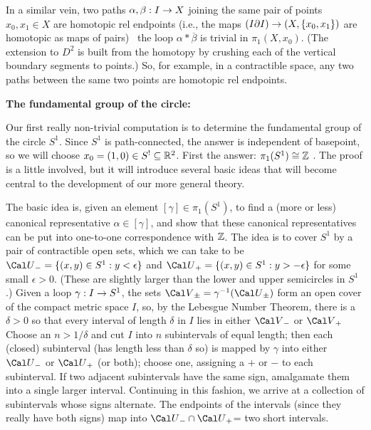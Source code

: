 In a similar vein, two paths $\alpha,\beta:I\rightarrow X$ joining the same pair of points
$x_0,x_1\in X$ are homotopic rel endpoints (i.e., the maps $(I\partial I)\rightarrow(X,\{x_0,x_1\})$
are homotopic as maps of pairs) \lra\ the loop $\alpha *\overline{\beta}$ is 
trivial in $\pi_1(X,x_0)$. (The extension to $D^2$ is built from the
homotopy by crushing each of the vertical boundary segments to points.) So, for
example, in a contractible space, any two paths between the same two points are
homotopic rel endpoints.

\msk

{\bf The fundamental group of the circle:}

\ssk

Our first really non-trivial computation is to determine the fundamental group of the
circle $S^1$. Since $S^1$ is path-connected, the answer is independent of basepoint,
so we will choose $x_0=(1,0)\in S^!\subseteq{\Bbb R}^2$. First the answer: $\pi_1(S^1)\cong{\Bbb Z}$ .
The proof is a little involved, but it will introduce several basic ideas that will
become central to the development of our more general theory.

The basic idea is, given an element $[\gamma]\in\pi_1(S^1)$, to find a (more or
less) canonical representative $\alpha\in[\gamma]$, and show that these canonical
representatives can be put into one-to-one correspondence with ${\Bbb Z}$. The idea
is to cover $S^1$ by a pair of contractible open sets, which we can take to be
${\Cal U}_- = \{(x,y)\in S^1 : y < \epsilon\}$ and ${\Cal U}_+ = \{(x,y)\in S^1 : y > -\epsilon\}$
for some small $\epsilon > 0$. (These are slightly larger than the lower and upper
semicircles in $S^1$.) Given a loop $\gamma:I\rightarrow S^1$, the sets 
${\Cal V}_\pm=\gamma^{-1}({\Cal U}_\pm)$
form an open cover of the compact metric space $I$, so, by the Lebesgue Number Theorem,
there is a $\delta>0$ so that every interval of length $\delta$ in $I$ lies in either
${\Cal V}_-$ or ${\Cal V}_+$ Choose an $n>1/\delta$ and cut $I$ into $n$ subintervals
of equal length; then each (closed) subinterval (has length less than $\delta$ so) 
is mapped by $\gamma$ into either 
${\Cal U}_-$ or ${\Cal U}_+$ (or both); choose one, assigning a $+$ or $-$ to each
subinterval. If two adjacent subintervals have the same sign, amalgamate them into a
single larger interval. Continuing in this fashion, we arrive at a collection of subintervals
whose signs alternate. The endpoints of the intervals (since they really have both signs) 
map into ${\Cal U}_-\cap{\Cal U}_+$= two short intervals. 

